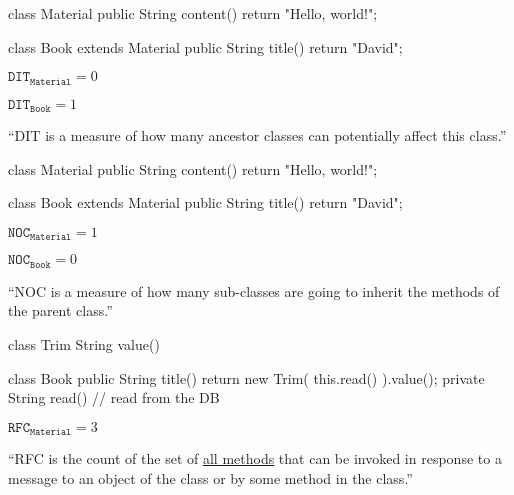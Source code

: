 \documentclass{article}
\begin{document}
\begin{multicols}{2}
{\small\begin{ffcode}
class Material {
  public String content() {
    return "Hello, world!";
  }
}

class Book extends Material {
  public String title() {
    return "David";
  }
}
\end{ffcode}
}
\par\columnbreak\par
\(\texttt{DIT}_\texttt{Material} = 0\)\par
\(\texttt{DIT}_\texttt{Book} = 1\)\par
``DIT is a measure of how many ancestor classes can potentially affect this class.''
\end{multicols}
\plush{}

\begin{multicols}{2}
{\small\begin{ffcode}
class Material {
  public String content() {
    return "Hello, world!";
  }
}

class Book extends Material {
  public String title() {
    return "David";
  }
}
\end{ffcode}
}
\par\columnbreak\par
\(\texttt{NOC}_\texttt{Material} = 1\)\par
\(\texttt{NOC}_\texttt{Book} = 0\)\par
``NOC is a measure of how many sub-classes are going to inherit the methods of the parent class.''
\end{multicols}
\plush{}

\begin{multicols}{2}
{\small\begin{ffcode}
class Trim
  String value()

class Book
  public String title()
    return new Trim(
      this.read()
    ).value();
  private String read()
    // read from the DB
\end{ffcode}
}
\par\columnbreak\par
\(\texttt{RFC}_\texttt{Material} = 3\)\par
``RFC is the count of the set of \ul{all methods} that can be invoked in response to a message to an object of the class or by some method in the class.''
\end{multicols}
\plush{}
\end{document}
